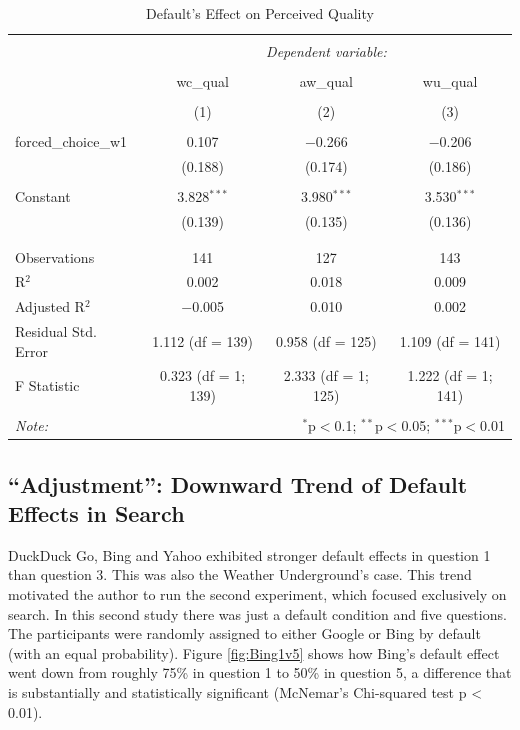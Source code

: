 \documentclass[
  11pt,
]{article}
\begin{document}
\begin{table}[!htbp] \centering 
  \caption{Default's Effect on Perceived Quality} 
  \label{tab:quals2} 
\small 
\begin{tabular}{@{\extracolsep{3pt}}lccc} 
\\[-1.8ex]\hline 
\hline \\[-1.8ex] 
 & \multicolumn{3}{c}{\textit{Dependent variable:}} \\ 
\cline{2-4} 
\\[-1.8ex] & wc\_qual & aw\_qual & wu\_qual \\ 
\\[-1.8ex] & (1) & (2) & (3)\\ 
\hline \\[-1.8ex] 
 forced\_choice\_w1 & 0.107 & $-$0.266 & $-$0.206 \\ 
  & (0.188) & (0.174) & (0.186) \\ 
  & & & \\ 
 Constant & 3.828$^{***}$ & 3.980$^{***}$ & 3.530$^{***}$ \\ 
  & (0.139) & (0.135) & (0.136) \\ 
  & & & \\ 
\hline \\[-1.8ex] 
Observations & 141 & 127 & 143 \\ 
R$^{2}$ & 0.002 & 0.018 & 0.009 \\ 
Adjusted R$^{2}$ & $-$0.005 & 0.010 & 0.002 \\ 
Residual Std. Error & 1.112 (df = 139) & 0.958 (df = 125) & 1.109 (df = 141) \\ 
F Statistic & 0.323 (df = 1; 139) & 2.333 (df = 1; 125) & 1.222 (df = 1; 141) \\ 
\hline 
\hline \\[-1.8ex] 
\textit{Note:}  & \multicolumn{3}{r}{$^{*}$p$<$0.1; $^{**}$p$<$0.05; $^{***}$p$<$0.01} \\ 
\end{tabular} 
\end{table}

\hypertarget{adjustment-downward-trend-of-default-effects-in-search}{%
\subsection{``Adjustment'': Downward Trend of Default Effects in Search}\label{adjustment-downward-trend-of-default-effects-in-search}}

DuckDuck Go, Bing and Yahoo exhibited stronger default effects in question 1 than question 3. This was also the Weather Underground's case. This trend motivated the author to run the second experiment, which focused exclusively on search. In this second study there was just a default condition and five questions. The participants were randomly assigned to either Google or Bing by default (with an equal probability). Figure \ref{fig:Bing1v5} shows how Bing's default effect went down from roughly 75\% in question 1 to 50\% in question 5, a difference that is substantially and statistically significant (McNemar's Chi-squared test p \textless{} 0.01).
\end{document}

